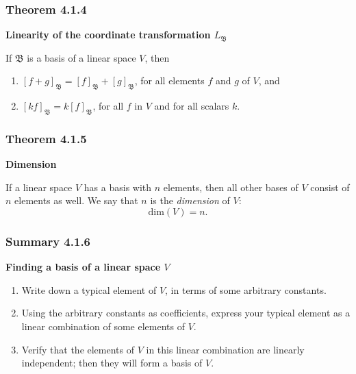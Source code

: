 \documentclass{report}
\begin{document}
\subsubsection*{Theorem 4.1.4}
\par\noindent\textbf{Linearity of the coordinate transformation $L_{\mathfrak{B}}$}
\par\noindent If $\mathfrak{B}$ is a basis of a linear space $V$, then
\renewcommand{\labelenumi}{\textbf{\alph{enumi}.}}
\begin{enumerate}
\item $[f+g]_{\mathfrak{B}}=[f]_{\mathfrak{B}}+[g]_{\mathfrak{B}}$, for all elements $f$ and $g$ of $V$, and
\item $[kf]_{\mathfrak{B}}=k[f]_{\mathfrak{B}}$, for all $f$ in $V$ and for all scalars $k$.
\end{enumerate}
\subsubsection*{Theorem 4.1.5}
\par\noindent\textbf{Dimension}
\par\noindent If a linear space $V$ has a basis with $n$ elements, then all other bases of $V$ consist of $n$ elements as well. We say that $n$ is the \textit{dimension} of $V$:
\[\textrm{dim}(V)=n.\]
\subsubsection*{Summary 4.1.6}
\par\noindent\textbf{Finding a basis of a linear space $V$}
\renewcommand{\labelenumi}{\textbf{\alph{enumi}.}}
\begin{enumerate}
\item Write down a typical element of $V$, in terms of some arbitrary constants.
\item Using the arbitrary constants as coefficients, express your typical element as a linear combination of some elements of $V$.
\item Verify that the elements of $V$ in this linear combination are linearly independent; then they will form a basis of $V$.
\end{enumerate}
\end{document}
